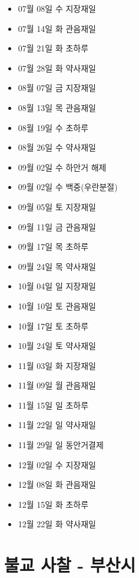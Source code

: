 \documentclass[12pt, a4paper, oneside]{book}
\begin{document}
\begin{itemize}	[
						topsep=0.0em, 
						parsep=0.0em, 
						itemsep=0em, 
						leftmargin=6.0em, 
						labelwidth=3em, 
						labelsep=3em
						]
			\item 07월 08일 수 지장재일
			\item 07월 14일 화 관음재일
			\item 07월 21일 화 초하루
			\item 07월 28일 화 약사재일

			\item 08월 07일 금 지장재일
			\item 08월 13일 목 관음재일
			\item 08월 19일 수 초하루
			\item 08월 26일 수 약사재일


			\item 09월 02일 수 하안거 해제
			\item 09월 02일 수 백중(우란분절)


			\item 09월 05일 토 지장재일
			\item 09월 11일 금 관음재일
			\item 09월 17일 목 초하루
			\item 09월 24일 목 약사재일

			\item 10월 04일 일 지장재일
			\item 10월 10일 토 관음재일
			\item 10월 17일 토 초하루
			\item 10월 24일 토 약사재일

			\item 11월 03일 화 지장재일
			\item 11월 09일 월 관음재일
			\item 11월 15일 일 초하루
			\item 11월 22일 일 약사재일

			\item 11월 29일 일 동안거결제


			\item 12월 02일 수 지장재일
			\item 12월 08일 화 관음재일
			\item 12월 15일 화 초하루
			\item 12월 22일 화 약사재일

			\end{itemize}




	\part{불교 사찰 - 부산시}
	\noptcrule
	\parttoc				
\end{document}
